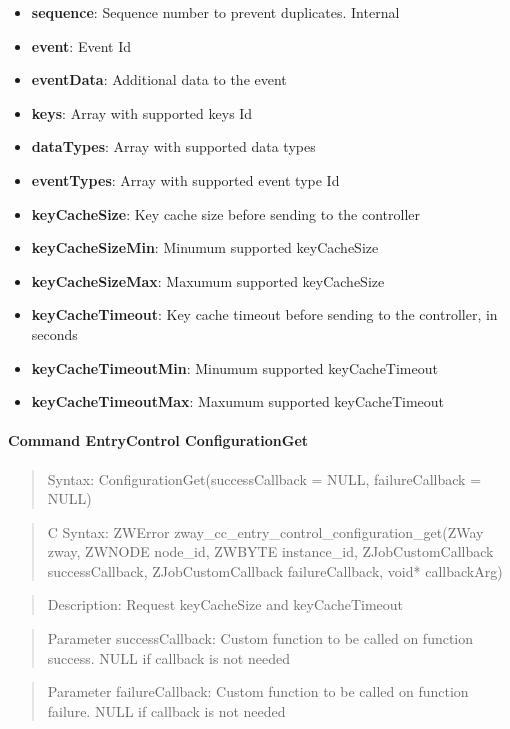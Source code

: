 \begin{itemize}
\item \textbf{sequence}: Sequence number to prevent duplicates. Internal
\item \textbf{event}: Event Id
\item \textbf{eventData}: Additional data to the event
\item \textbf{keys}: Array with supported keys Id
\item \textbf{dataTypes}: Array with supported data types
\item \textbf{eventTypes}: Array with supported event type Id
\item \textbf{keyCacheSize}: Key cache size before sending to the controller
\item \textbf{keyCacheSizeMin}: Minumum supported keyCacheSize
\item \textbf{keyCacheSizeMax}: Maxumum supported keyCacheSize
\item \textbf{keyCacheTimeout}: Key cache timeout before sending to the controller, in seconds
\item \textbf{keyCacheTimeoutMin}: Minumum supported keyCacheTimeout
\item \textbf{keyCacheTimeoutMax}: Maxumum supported keyCacheTimeout
\end{itemize}

\paragraph{Command EntryControl ConfigurationGet}
\begin{quote}Syntax: ConfigurationGet(successCallback = NULL, failureCallback = NULL)\end{quote}
\begin{quote}C Syntax: ZWError zway\_cc\_entry\_control\_configuration\_get(ZWay zway, ZWNODE node\_id, ZWBYTE instance\_id, ZJobCustomCallback successCallback, ZJobCustomCallback failureCallback, void* callbackArg)\end{quote}
\begin{quote}Description: Request keyCacheSize and keyCacheTimeout\end{quote}
\begin{quote}Parameter successCallback: Custom function to be called on function success. NULL if callback is not needed\end{quote}
\begin{quote}Parameter failureCallback: Custom function to be called on function failure. NULL if callback is not needed\end{quote}


